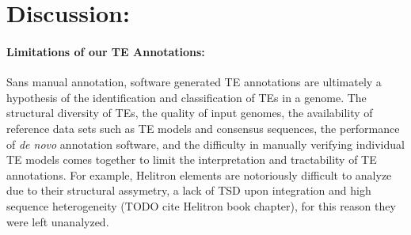 \documentclass[fleqn,10pt]{olplainarticle}
\begin{document}





\section{Discussion:}
\paragraph{Limitations of our TE Annotations:}
Sans manual annotation, software generated TE annotations are ultimately a hypothesis of the identification and classification of TEs in a genome.
The structural diversity of TEs, the quality of input genomes, the availability of reference data sets such as TE models and consensus sequences, the performance of \textit{de novo} annotation software, and the difficulty in manually verifying individual TE models comes together to limit the interpretation and tractability of TE annotations. 
For example, Helitron elements are notoriously difficult to analyze due to their structural assymetry, a lack of TSD upon integration and high sequence heterogeneity (TODO cite Helitron book chapter), for this reason they were left unanalyzed.
\end{document}
